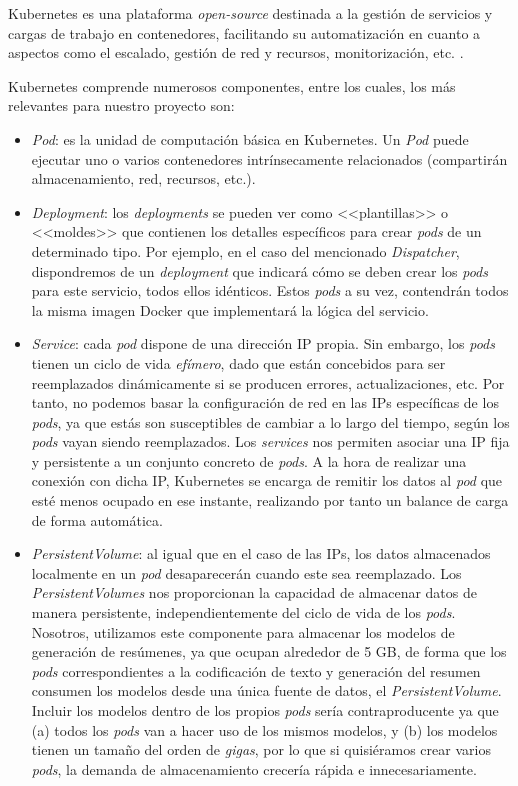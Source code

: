 Kubernetes es una plataforma \emph{open-source} destinada a la gestión de servicios y cargas de trabajo en contenedores, facilitando su automatización en cuanto a aspectos como el escalado, gestión de red y recursos, monitorización, etc. \cite{kubernetes}.

Kubernetes comprende numerosos componentes, entre los cuales, los más relevantes para nuestro proyecto son:

\vspace{-0.5cm}
\begin{itemize}
	\item [\textbullet] \emph{Pod}: es la unidad de computación básica en Kubernetes. Un \emph{Pod} puede ejecutar uno o varios contenedores intrínsecamente relacionados (compartirán almacenamiento, red, recursos, etc.). 
	\item [\textbullet] \emph{Deployment}: los \emph{deployments} se pueden ver como <<plantillas>> o <<moldes>> que contienen los detalles específicos para crear \emph{pods} de un determinado tipo. Por ejemplo, en el caso del mencionado \emph{Dispatcher}, dispondremos de un \emph{deployment} que indicará cómo se deben crear los \emph{pods} para este servicio, todos ellos idénticos. Estos \emph{pods} a su vez, contendrán todos la misma imagen Docker que implementará la lógica del servicio.
	\item [\textbullet] \emph{Service}: cada \emph{pod} dispone de una dirección IP propia. Sin embargo, los \emph{pods} tienen un ciclo de vida \emph{efímero}, dado que están concebidos para ser reemplazados dinámicamente si se producen errores, actualizaciones, etc. Por tanto, no podemos basar la configuración de red en las IPs específicas de los \emph{pods}, ya que estás son susceptibles de cambiar a lo largo del tiempo, según los \emph{pods} vayan siendo reemplazados. Los \emph{services} nos permiten asociar una IP fija y persistente a un conjunto concreto de \emph{pods}. A la hora de realizar una conexión con dicha IP, Kubernetes se encarga de remitir los datos al \emph{pod} que esté menos ocupado en ese instante, realizando por tanto un balance de carga de forma automática.
	
	\item [\textbullet] \emph{PersistentVolume}: al igual que en el caso de las IPs, los datos almacenados localmente en un \emph{pod} desaparecerán cuando este sea reemplazado. Los \emph{PersistentVolumes} nos proporcionan la capacidad de almacenar datos de manera persistente, independientemente del ciclo de vida de los \emph{pods}. Nosotros, utilizamos este componente para almacenar los modelos de generación de resúmenes, ya que ocupan alrededor de 5 GB, de forma que los \emph{pods} correspondientes a la codificación de texto y generación del resumen consumen los modelos desde una única fuente de datos, el \emph{PersistentVolume}. Incluir los modelos dentro de los propios \emph{pods} sería contraproducente ya que (a) todos los \emph{pods} van a hacer uso de los mismos modelos, y (b) los modelos tienen un tamaño del orden de \emph{gigas}, por lo que si quisiéramos crear varios \emph{pods}, la demanda de almacenamiento crecería rápida e innecesariamente.
\end{itemize}

